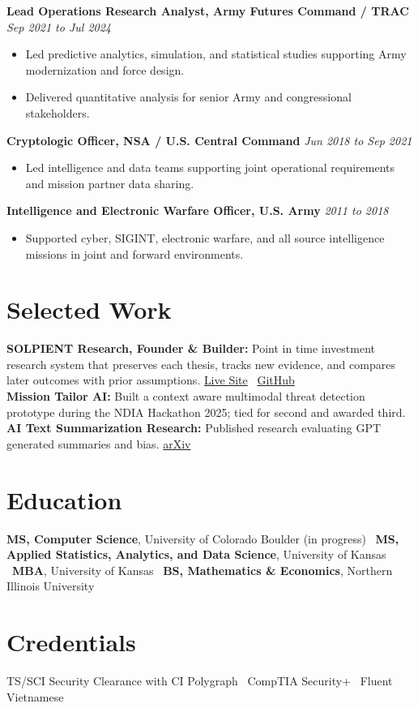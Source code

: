 \documentclass[a4paper,10pt]{article}
\begin{document}
\textbf{Lead Operations Research Analyst, Army Futures Command / TRAC} \hfill \textit{Sep 2021 to Jul 2024}
\begin{itemize}
    \item Led predictive analytics, simulation, and statistical studies supporting Army modernization and force design.
    \item Delivered quantitative analysis for senior Army and congressional stakeholders.
\end{itemize}

\textbf{Cryptologic Officer, NSA / U.S. Central Command} \hfill \textit{Jun 2018 to Sep 2021}
\begin{itemize}
    \item Led intelligence and data teams supporting joint operational requirements and mission partner data sharing.
\end{itemize}

\textbf{Intelligence and Electronic Warfare Officer, U.S. Army} \hfill \textit{2011 to 2018}
\begin{itemize}
    \item Supported cyber, SIGINT, electronic warfare, and all source intelligence missions in joint and forward environments.
\end{itemize}

\section*{Selected Work}
\textbf{SOLPIENT Research, Founder \& Builder:} Point in time investment research system that preserves each thesis, tracks new evidence, and compares later outcomes with prior assumptions. \href{https://solpient-research-app.vercel.app/}{Live Site} \textbar\ \href{https://github.com/ngkenzy/solpient-research}{GitHub}\\
\textbf{Mission Tailor AI:} Built a context aware multimodal threat detection prototype during the NDIA Hackathon 2025; tied for second and awarded third.\\
\textbf{AI Text Summarization Research:} Published research evaluating GPT generated summaries and bias. \href{http://arxiv.org/abs/2405.04053}{arXiv}

\section*{Education}
\textbf{MS, Computer Science}, University of Colorado Boulder (in progress) \textbar\
\textbf{MS, Applied Statistics, Analytics, and Data Science}, University of Kansas \textbar\
\textbf{MBA}, University of Kansas \textbar\
\textbf{BS, Mathematics \& Economics}, Northern Illinois University

\section*{Credentials}
TS/SCI Security Clearance with CI Polygraph \textbar\ CompTIA Security+ \textbar\ Fluent Vietnamese
\end{document}
